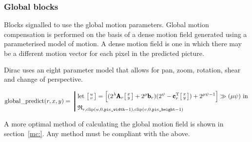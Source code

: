 \subsubsection{Global blocks}
Blocks signalled to use the global motion parameters. Global motion
compensation is performed on the basis of a dense motion field generated
using a parameterised model of motion.  A dense motion field is one in
which there may be a different motion vector for each pixel in the
predicted picture.

Dirac uses an eight parameter model that allows for pan, zoom, rotation,
shear and change of perspective.


\begin{equation*}
\text{global\_predict}(r,x,y) =
  \left\bracevert\begin{aligned}
    &\text{let } \bigl[\begin{smallmatrix}u\\v\end{smallmatrix}\bigr] = \Bigl[(2^\lambda\pmb{\text{A}}_r\bigl[\begin{smallmatrix}x\\y\end{smallmatrix}\bigr] + 2^\mu\pmb{\text{b}}_r)(2^\psi - \pmb{\text{c}}_r^\text{T}\bigl[\begin{smallmatrix}x\\y\end{smallmatrix}\bigr]) + 2^{\mu\psi-1} \Bigr] \gg (\mu\psi) \text{ in}\\
    &\mathfrak{R}_{r, \operatorname{clip}(u, 0, \text{\texttt{pic\_width}}-1), \operatorname{clip}(v, 0, \text{\texttt{pic\_height}}-1)}
    \end{aligned}\right.
\end{equation*}

A more optimal method of calculating the global motion field is shown in
section~\ref{mc:}.  Any method must be compliant with the above.
